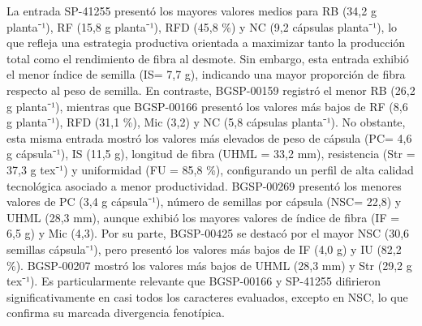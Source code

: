 \documentclass[12pt,oneside]{reedthesis}
\begin{document}
La entrada SP-41255 presentó los mayores valores medios para RB (34,2 g planta⁻¹), RF (15,8 g planta⁻¹), RFD (45,8 \%) y NC (9,2 cápsulas planta⁻¹), lo que refleja una estrategia productiva orientada a maximizar tanto la producción total como el rendimiento de fibra al desmote. Sin embargo, esta entrada exhibió el menor índice de semilla (IS= 7,7 g), indicando una mayor proporción de fibra respecto al peso de semilla. En contraste, BGSP-00159 registró el menor RB (26,2 g planta⁻¹), mientras que BGSP-00166 presentó los valores más bajos de RF (8,6 g planta⁻¹), RFD (31,1 \%), Mic (3,2) y NC (5,8 cápsulas planta⁻¹). No obstante, esta misma entrada mostró los valores más elevados de peso de cápsula (PC= 4,6 g cápsula⁻¹), IS (11,5 g), longitud de fibra (UHML = 33,2 mm), resistencia (Str = 37,3 g tex⁻¹) y uniformidad (FU = 85,8 \%), configurando un perfil de alta calidad tecnológica asociado a menor productividad. BGSP-00269 presentó los menores valores de PC (3,4 g cápsula⁻¹), número de semillas por cápsula (NSC= 22,8) y UHML (28,3 mm), aunque exhibió los mayores valores de índice de fibra (IF = 6,5 g) y Mic (4,3). Por su parte, BGSP-00425 se destacó por el mayor NSC (30,6 semillas cápsula⁻¹), pero presentó los valores más bajos de IF (4,0 g) y IU (82,2 \%). BGSP-00207 mostró los valores más bajos de UHML (28,3 mm) y Str (29,2 g tex⁻¹). Es particularmente relevante que BGSP-00166 y SP-41255 difirieron significativamente en casi todos los caracteres evaluados, excepto en NSC, lo que confirma su marcada divergencia fenotípica.
\end{document}
